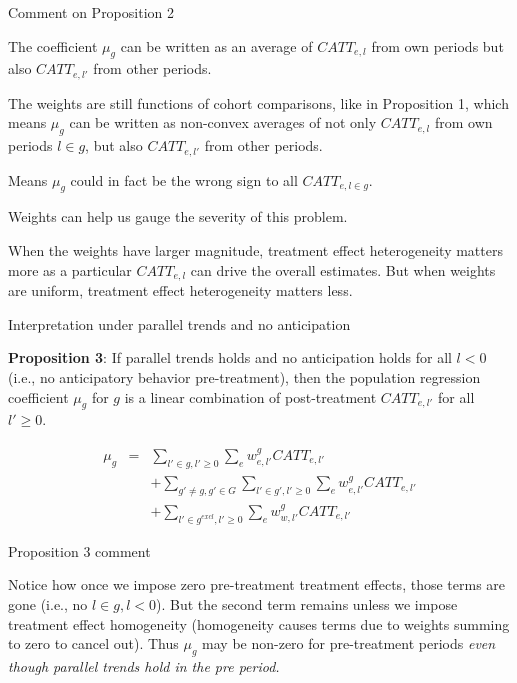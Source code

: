 \documentclass{beamer}
\begin{document}
\begin{frame}{Comment on Proposition 2}

The coefficient $\mu_g$ can be written as an average of $CATT_{e,l}$ from own periods but also $CATT_{e,l'}$ from other periods.

\bigskip

The weights are still functions of cohort comparisons, like in Proposition 1, which means $\mu_g$ can be written as non-convex averages of not only $CATT_{e,l}$ from own periods $l \in g$, but also $CATT_{e,l'}$ from other periods. 

\bigskip 

Means $\mu_g$ could in fact be the wrong sign to all $CATT_{e, l\in g}$. 

\bigskip

Weights can help us gauge the severity of this problem. 

\bigskip

When the weights have larger magnitude, treatment effect heterogeneity matters more as a particular $CATT_{e,l}$ can drive the overall estimates. But when weights are uniform, treatment effect heterogeneity matters less.
\end{frame}


\begin{frame}{Interpretation under parallel trends and no anticipation}

\textbf{Proposition 3}: If parallel trends holds and no anticipation holds for all $l<0$ (i.e., no anticipatory behavior pre-treatment), then the population regression coefficient $\mu_g$ for $g$ is a linear combination of post-treatment $CATT_{e,l'}$ for all $l' \geq 0$.

\begin{eqnarray*}
\mu_g &=& \sum_{l' \in g, l' \geq 0} \sum_e w^g_{e,l'} CATT_{e,l'} \\
&&+ \sum_{g' \neq g,g' \in G} \sum_{l' \in g', l' \geq 0} \sum_e w^g_{e,l'} CATT_{e,l'} \\
&&+ \sum_{l' \in g^{excl},l' \geq 0} \sum_e w^g_{w,l'} CATT_{e,l'}
\end{eqnarray*}

\end{frame}

\begin{frame}{Proposition 3 comment}

Notice how once we impose zero pre-treatment treatment effects, those terms are gone (i.e., no $l \in g, l<0$).  But the second term remains unless we impose treatment effect homogeneity (homogeneity causes terms due to weights summing to zero to cancel out). Thus $\mu_g$ may be non-zero for pre-treatment periods \emph{even though parallel trends hold in the pre period.}

\end{frame}
\end{document}

